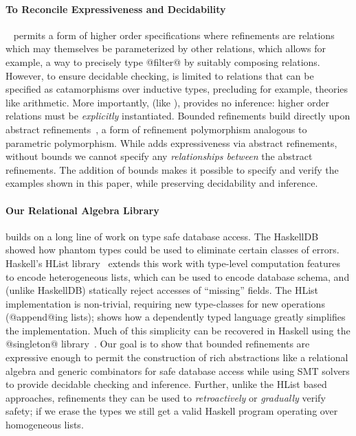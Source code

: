 \paragraph{To Reconcile Expressiveness and Decidability}
%
\catalyst~\citep{catalyst} permits a form of
higher order specifications where refinements
are relations which may themselves be parameterized
by other relations, which allows for example, a
way to precisely type @filter@ by suitably
composing relations.
%
However, to ensure decidable checking, \catalyst
is limited to relations that can be specified as
catamorphisms over inductive types, precluding
for example, theories like arithmetic.
More importantly, (like \fstar), \catalyst provides
no inference: higher order relations must be
\emph{explicitly} instantiated.
%
Bounded refinements build directly upon
abstract refinements~\citep{vazou13},
a form of refinement polymorphism
analogous to parametric polymorphism.
%
While \cite{vazou13} adds expressiveness via
abstract refinements, without bounds we cannot
specify any \emph{relationships between} the
abstract refinements. The addition of bounds
makes it possible to specify and verify the examples
shown in this paper,
while preserving decidability and inference.

\paragraph{Our Relational Algebra Library} builds on a long
line of work on type safe database access.
%
The HaskellDB~\citep{haskellDB}
showed how phantom types could be used to eliminate
certain classes of errors.
%
Haskell's HList library~\citep{heterogeneous}
extends this work with type-level computation
features to encode heterogeneous lists, which
can be used to encode database schema, and
(unlike HaskellDB) statically reject accesses
of ``missing'' fields.
%
The HList implementation is non-trivial,
requiring new type-classes for new operations
(\eg @append@ing lists); \citep{thepipower}
shows how a dependently typed language greatly
simplifies the implementation.
%
Much of this simplicity can be recovered in
Haskell using the @singleton@ library~\citep{Weirich12}.
%
Our goal is to show that bounded refinements
are expressive enough to permit the construction
of rich abstractions like a relational algebra
and generic combinators for safe database access
while using SMT solvers to provide decidable
checking and inference. Further, unlike the
HList based approaches, refinements they can
be used to \emph{retroactively} or \emph{gradually}
verify safety; if we erase the types we still
get a valid Haskell program operating over
homogeneous lists.


